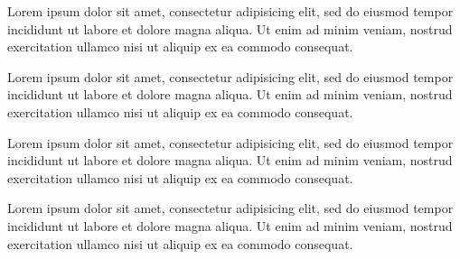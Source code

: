 \documentclass{book}
\begin{document}
\begin{ledgroup}
\beginnumbering
\pstart
Lorem ipsum dolor sit amet, consectetur adipisicing elit, sed do eiusmod tempor incididunt ut labore et dolore magna aliqua. Ut enim ad minim veniam, nostrud exercitation ullamco  nisi ut aliquip ex ea commodo consequat. 
\pend
\endnumbering
\end{ledgroup}
\begin{pages}
\begin{Leftside}
\beginnumbering

\pstart
\begin{ledgroup}

Lorem ipsum dolor sit amet, consectetur adipisicing elit, sed do eiusmod tempor incididunt ut labore et dolore magna aliqua. Ut enim ad minim veniam, nostrud exercitation ullamco  nisi ut aliquip ex ea commodo consequat. 

\end{ledgroup}
\pend

\pstart
\begin{ledgroup}

Lorem ipsum dolor sit amet, consectetur adipisicing elit, sed do eiusmod tempor incididunt ut labore et dolore magna aliqua. Ut enim ad minim veniam, nostrud exercitation ullamco  nisi ut aliquip ex ea commodo consequat. 

\end{ledgroup}
\pend
\pstart
\begin{ledgroup}

Lorem ipsum dolor sit amet, consectetur adipisicing elit, sed do eiusmod tempor incididunt ut labore et dolore magna aliqua. Ut enim ad minim veniam, nostrud exercitation ullamco  nisi ut aliquip ex ea commodo consequat. 

\end{ledgroup}
\pend


\end{Leftside}
\end{pages}
\end{document}

